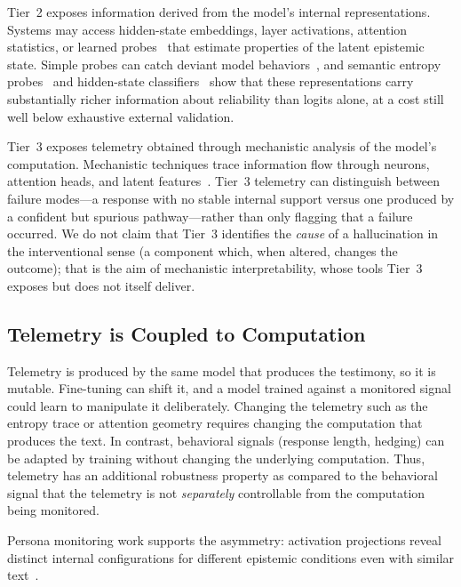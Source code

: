Tier~2 exposes information derived from the model's internal representations. Systems may access hidden-state embeddings, layer activations, attention statistics, or learned probes~\cite{belinkov2022probing,alain2016understanding} that estimate properties of the latent epistemic state.
Simple probes can catch deviant model behaviors~\cite{macdiarmid2024sleeperagentprobes,han2025simple,goldowsky2025detecting}, and semantic entropy probes~\cite{kossen2024semantic,kuhn2023semanticuncertaintylinguisticinvariances} and hidden-state classifiers~\cite{zhang2025icr} show that these representations carry substantially richer information about reliability than logits alone, at a cost still well below exhaustive external validation.

Tier~3 exposes telemetry obtained through mechanistic analysis of the model's computation.
Mechanistic techniques trace information flow through neurons, attention heads, and latent features~\cite{somvanshi2026bridging}.
Tier~3 telemetry can distinguish between failure modes---a response with no stable internal support versus one produced by a confident but spurious pathway---rather than only flagging that a failure occurred.
We do not claim that Tier~3 identifies the \emph{cause} of a hallucination in the interventional sense (a component which, when altered, changes the outcome); that is the aim of mechanistic interpretability, whose tools Tier~3 exposes but does not itself deliver.


\subsection{Telemetry is Coupled to Computation}
\label{sec:threat}

Telemetry is produced by the same model that produces the testimony, so it is mutable.
Fine-tuning can shift it, and a model trained against a monitored signal could learn to manipulate it deliberately.
Changing the telemetry such as the entropy trace or attention geometry requires
changing the computation that produces the text.
In contrast, behavioral signals (response length, hedging) can be adapted by training
without changing the underlying computation. Thus, telemetry
has an additional robustness property as compared to the behavioral signal
that the telemetry is not \emph{separately} controllable from the computation
being monitored.

Persona monitoring work supports the asymmetry: activation
projections reveal distinct internal configurations for different epistemic
conditions even with similar text~\cite{lu2026assistantaxissituatingstabilizing}.

